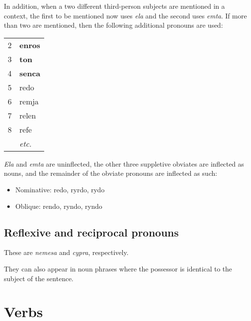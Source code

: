 \documentclass{book}
\begin{document}
In addition, when a two different third-person subjects are mentioned in a context, the first to be mentioned now uses \emph{ela} and the second uses \emph{emta}. If more than two are mentioned, then the following additional pronouns are used:

\begin{center}
	\begin{tabular}{|r|l|}
		\hline
		2 & \textbf{enros} \\
		3 & \textbf{ton} \\
		4 & \textbf{senca} \\
		5 & redo \\
		6 & remja \\
		7 & relen \\
		8 & refe \\
		& \emph{etc.} \\
		\hline
	\end{tabular}
\end{center}

\emph{Ela} and \emph{emta} are uninflected, the other three suppletive obviates are inflected as nouns, and the remainder of the obviate pronouns are inflected as such:

\begin{itemize}
	\item Nominative: redo, ryrdo, rydo
	\item Oblique: rendo, ryndo, ryndo
\end{itemize}

\subsection{Reflexive and reciprocal pronouns}

These are \emph{nemesa} and \emph{cypra}, respectively.


They can also appear in noun phrases where the possessor is identical to the subject of the sentence.


\section{Verbs}
\end{document}
